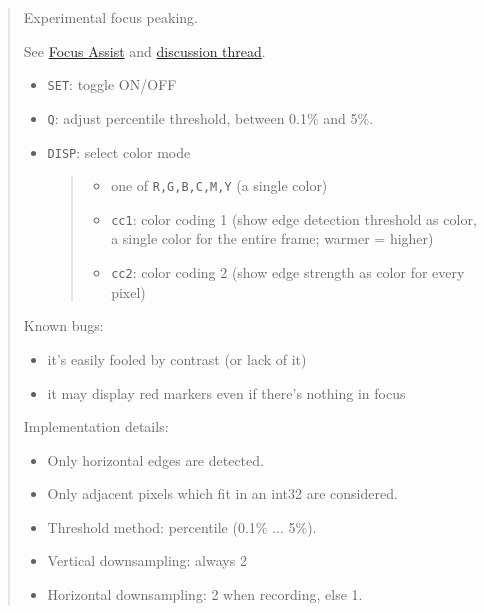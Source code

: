 \documentclass[a4paper,english]{article}
\begin{document}
\begin{quote}

Experimental focus peaking.

See \href{http://magiclantern.wikia.com/wiki/Focus\%20Assist}{Focus Assist} and \href{http://groups.google.com/group/ml-devel/browse_thread/thread/d29edd39ae8db9ae}{discussion thread}.
%
\begin{itemize}

\item \texttt{SET}: toggle ON/OFF

\item \texttt{Q}: adjust percentile threshold, between 0.1\% and 5\%.

\item \texttt{DISP}: select color mode
%
\begin{quote}
%
\begin{itemize}

\item one of \texttt{R,G,B,C,M,Y} (a single color)

\item \texttt{cc1}: color coding 1 (show edge detection threshold as color, a single color for the entire frame; warmer = higher)

\item \texttt{cc2}: color coding 2 (show edge strength as color for every pixel)

\end{itemize}

\end{quote}

\end{itemize}

Known bugs:
%
\begin{itemize}

\item it's easily fooled by contrast (or lack of it)

\item it may display red markers even if there's nothing in focus

\end{itemize}

Implementation details:
%
\begin{itemize}

\item Only horizontal edges are detected.

\item Only adjacent pixels which fit in an int32 are considered.

\item Threshold method: percentile (0.1\% ... 5\%).

\item Vertical downsampling: always 2

\item Horizontal downsampling: 2 when recording, else 1.

\end{itemize}

\end{quote}
\end{document}
